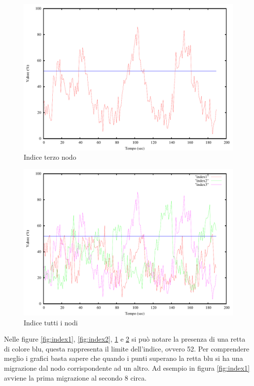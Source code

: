\begin{figure}[H]
\begin{center}
\includegraphics[scale=0.6]{etc/index3.pdf}
\caption{Indice terzo nodo}
\label{fig:index3}
\end{center}
\end{figure}
\begin{figure}[H]
\begin{center}
\includegraphics[scale=0.6]{etc/index.pdf}
\caption{Indice tutti i nodi}
\label{fig:index}
\end{center}
\end{figure}
Nelle figure \ref{fig:index1}, \ref{fig:index2}, \ref{fig:index3} e \ref{fig:index} si può notare la presenza di una retta di colore blu, questa rappresenta il limite dell'indice, ovvero 52. Per comprendere meglio i grafici basta sapere che quando i punti superano la retta blu si ha una migrazione dal nodo corrispondente ad un altro. Ad esempio in figura \ref{fig:index1} avviene la prima migrazione al secondo 8 circa.

